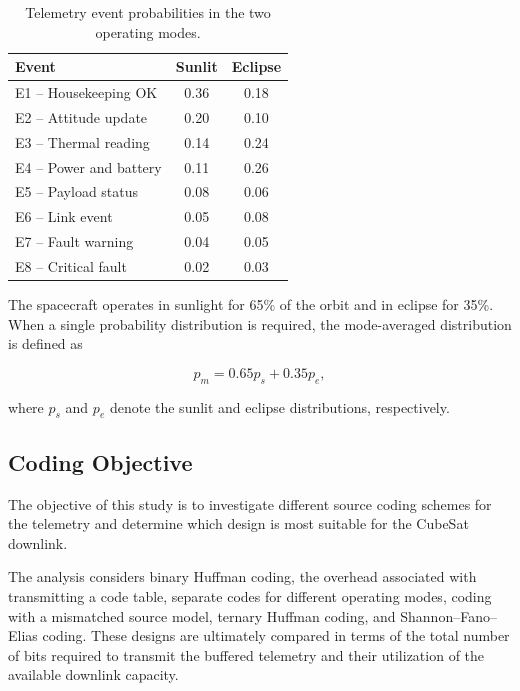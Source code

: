 \documentclass[11pt,a4paper]{article}
\begin{document}
\begin{table}[H]
    \centering
    \caption{Telemetry event probabilities in the two operating modes.}
    \label{tab:probabilities}
    \begin{tabular}{lcc}
        \toprule
        \textbf{Event} & \textbf{Sunlit} & \textbf{Eclipse} \\
        \midrule
        E1 -- Housekeeping OK       & 0.36 & 0.18 \\
        E2 -- Attitude update       & 0.20 & 0.10 \\
        E3 -- Thermal reading       & 0.14 & 0.24 \\
        E4 -- Power and battery     & 0.11 & 0.26 \\
        E5 -- Payload status        & 0.08 & 0.06 \\
        E6 -- Link event            & 0.05 & 0.08 \\
        E7 -- Fault warning         & 0.04 & 0.05 \\
        E8 -- Critical fault        & 0.02 & 0.03 \\
        \bottomrule
    \end{tabular}
\end{table}

The spacecraft operates in sunlight for 65\% of the orbit and in
eclipse for 35\%. When a single probability distribution is required,
the mode-averaged distribution is defined as

\begin{equation}
    p_m = 0.65p_s + 0.35p_e,
\end{equation}

where \(p_s\) and \(p_e\) denote the sunlit and eclipse distributions,
respectively.

\subsection{Coding Objective}

The objective of this study is to investigate different source coding
schemes for the telemetry and determine which design is most suitable
for the CubeSat downlink.

The analysis considers binary Huffman coding, the overhead associated
with transmitting a code table, separate codes for different operating
modes, coding with a mismatched source model, ternary Huffman coding,
and Shannon--Fano--Elias coding. These designs are ultimately compared
in terms of the total number of bits required to transmit the buffered
telemetry and their utilization of the available downlink capacity.
\end{document}
